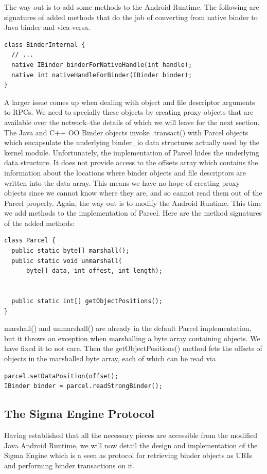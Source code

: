 \documentclass[prodmode]{acmlarge}
\begin{document}
The way out is to add some methods to the Android Runtime. The following are signatures of added methods that do the job of converting from native binder to Java binder and vica-versa.

\begin{Verbatim}[samepage=true]
class BinderInternal {
  // ...
  native IBinder binderForNativeHandle(int handle);
  native int nativeHandleForBinder(IBinder binder);
}
\end{Verbatim}

A larger issue comes up when dealing with object and file descriptor arguments to RPCs. We need to specially these objects by creating proxy objects that are available over the network--the details of which we will leave for the next section. The Java and C++ OO Binder objects invoke .transact() with Parcel objects which encapsulate the underlying binder\_io data structures actually used by the kernel module. Unfortunately, the implementation of Parcel hides the underlying data structure. It does not provide access to the offsets array which contains the information about the locations where binder objects and file descriptors are written into the data array. This means we have no hope of creating proxy objects since we cannot know where they are, and so cannot read them out of the Parcel properly.
Again, the way out is to modify the Android Runtime. This time we add methods to the implementation of Parcel. Here are the method signatures of the added methods:
\begin{Verbatim}[samepage=true]
class Parcel {
  public static byte[] marshall();
  public static void unmarshall(
      byte[] data, int offest, int length);


  public static int[] getObjectPositions();
}
\end{Verbatim}

marshall() and unmarshall() are already in the default Parcel implementation, but it throws an exception when marshalling a byte array containing objects. We have fixed it to not care. Then the getObjectPositions() method fets the offsets of objects in the marshalled byte array, each of which can be read via
\begin{Verbatim}[samepage=true]
parcel.setDataPosition(offset);
IBinder binder = parcel.readStrongBinder();
\end{Verbatim}

\subsection{The Sigma Engine Protocol}
Having established that all the necessary pieces are accessible from the modified Java Android Runtime, we will now detail the design and implementation of the Sigma Engine which is a seen as protocol for retrieving binder objects as URIs and performing binder transactions on it.
\end{document}
